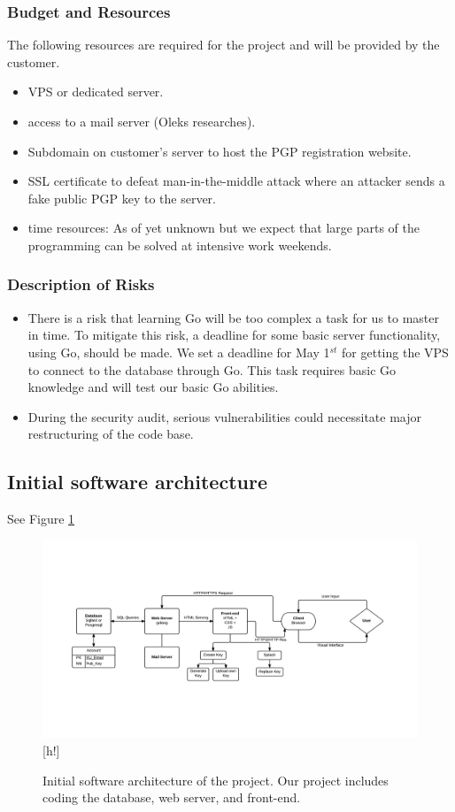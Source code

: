\documentclass[11pt,a4paper]{article}
\begin{document}
\subsubsection{Budget and Resources}
The following resources are required for the project and will be provided by the customer.
\begin{itemize}
\item VPS or dedicated server.
\item access to a mail server (Oleks researches).
\item Subdomain on customer's server to host the PGP registration website.
\item SSL certificate to defeat man-in-the-middle attack where an attacker sends a fake public PGP key to the server.
\item time resources: As of yet unknown but we expect that large parts of the programming can be solved at intensive work weekends.
\end{itemize}
\subsubsection{Description of Risks}
\begin{itemize}
\item There is a risk that learning Go will be too complex a task for us to master in time. To mitigate this risk, a deadline for some basic server functionality, using Go, should be made. We set a deadline for May 1$^{st}$ for getting the VPS to connect to the database through Go. This task requires basic Go knowledge and will test our basic Go abilities.
\item During the security audit, serious vulnerabilities could necessitate major restructuring of the code base.
\end{itemize}
\subsection{Initial software
architecture}
See Figure \ref{fig:ISA}
\begin{figure}
\centering
\includegraphics[width=1.1\textwidth]{pictures/pksu_isa_centered}[h!]
\caption{Initial software architecture of the project. Our project includes coding the database, web server, and front-end.}
\label{fig:ISA}
\end{figure}
\newpage
\end{document}
